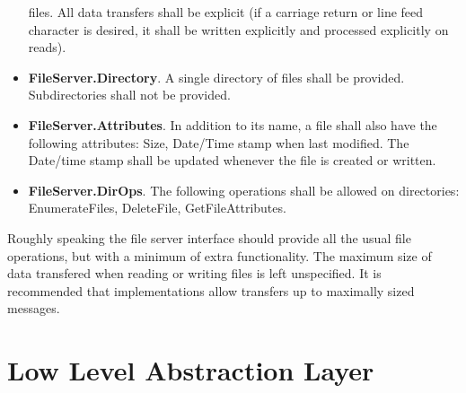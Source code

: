 \begin{itemize}
  files. All data transfers shall be explicit (if a carriage return or line feed character is
  desired, it shall be written explicitly and processed explicitly on reads).
\item \textbf{FileServer.Directory}. A single directory of files shall be provided.
  Subdirectories shall not be provided.
\item \textbf{FileServer.Attributes}. In addition to its name, a file shall also have the
  following attributes: Size, Date/Time stamp when last modified. The Date/time stamp shall be
  updated whenever the file is created or written.
\item \textbf{FileServer.DirOps}. The following operations shall be allowed on directories:
  EnumerateFiles, DeleteFile, GetFileAttributes.
\end{itemize}

Roughly speaking the file server interface should provide all the usual file operations, but
with a minimum of extra functionality. The maximum size of data transfered when reading or
writing files is left unspecified. It is recommended that implementations allow transfers up to
maximally sized messages.


\section{Low Level Abstraction Layer}
\label{sec:llal}

